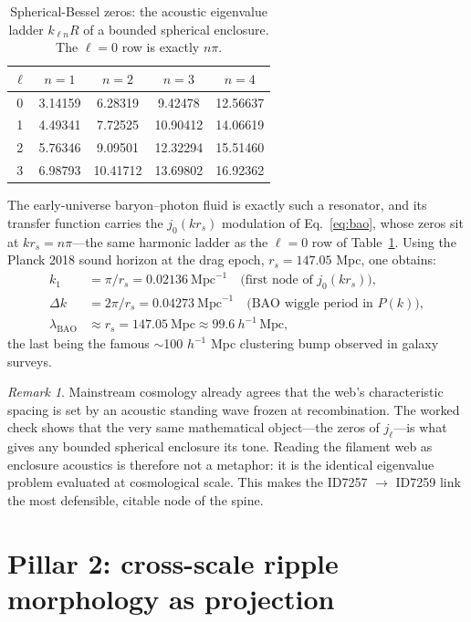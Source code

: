 \documentclass[11pt]{article}
\theoremstyle{remark}
\newtheorem{remark}[theorem]{Remark}
\begin{document}
\begin{table}[ht]
\centering
\caption{Spherical-Bessel zeros: the acoustic eigenvalue ladder $k_{\ell n}R$ of a bounded spherical enclosure. The $\ell=0$ row is exactly $n\pi$.}
\label{tab:besselzeros}
\begin{tabular}{ccccc}
\toprule
$\ell$ & $n=1$ & $n=2$ & $n=3$ & $n=4$ \\
\midrule
0 & 3.14159 & 6.28319 & 9.42478 & 12.56637 \\
1 & 4.49341 & 7.72525 & 10.90412 & 14.06619 \\
2 & 5.76346 & 9.09501 & 12.32294 & 15.51460 \\
3 & 6.98793 & 10.41712 & 13.69802 & 16.92362 \\
\bottomrule
\end{tabular}
\end{table}

The early-universe baryon--photon fluid is exactly such a resonator, and its transfer function carries the $j_0(k r_s)$ modulation of Eq.~\eqref{eq:bao}, whose zeros sit at $k r_s = n\pi$---the same harmonic ladder as the $\ell = 0$ row of Table~\ref{tab:besselzeros}. Using the Planck 2018 sound horizon at the drag epoch, $r_s = 147.05$ Mpc, one obtains:
\begin{align}
k_1 &= \pi / r_s = 0.02136\ \mathrm{Mpc}^{-1} \quad \text{(first node of } j_0(k r_s)\text{)},\\
\Delta k &= 2\pi / r_s = 0.04273\ \mathrm{Mpc}^{-1} \quad \text{(BAO wiggle period in } P(k)\text{)},\\
\lambda_{\mathrm{BAO}} &\approx r_s = 147.05\ \mathrm{Mpc} \approx 99.6\ h^{-1}\,\mathrm{Mpc},
\end{align}
the last being the famous $\sim$100 $h^{-1}$ Mpc clustering bump observed in galaxy surveys.

\begin{remark}
Mainstream cosmology already agrees that the web's characteristic spacing is set by an acoustic standing wave frozen at recombination. The worked check shows that the very same mathematical object---the zeros of $j_\ell$---is what gives any bounded spherical enclosure its tone. Reading the filament web as enclosure acoustics is therefore not a metaphor: it is the identical eigenvalue problem evaluated at cosmological scale. This makes the ID7257 $\to$ ID7259 link the most defensible, citable node of the spine.
\end{remark}

\section{Pillar 2: cross-scale ripple morphology as projection}
\label{sec:pillar2}
\end{document}
